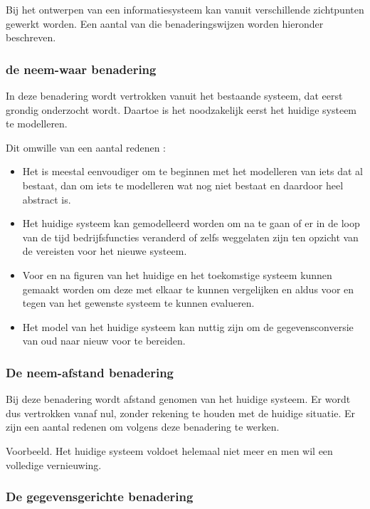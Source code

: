 Bij het ontwerpen van een informatiesysteem kan vanuit verschillende zichtpunten gewerkt worden. Een aantal van die benaderingswijzen worden hieronder beschreven.

\subsubsection{de neem-waar benadering}

In deze benadering wordt vertrokken vanuit het bestaande systeem, dat eerst grondig onderzocht wordt. Daartoe is het noodzakelijk eerst het huidige systeem te modelleren.

Dit omwille van een aantal redenen :

\begin{itemize}
    \item Het is meestal eenvoudiger om te beginnen met het modelleren van iets dat al bestaat, dan om iets te modelleren wat nog niet bestaat en daardoor heel abstract is.
    \item Het huidige systeem kan gemodelleerd worden om na te gaan of er in de loop van de tijd bedrijfsfuncties veranderd of zelfs weggelaten zijn ten opzicht van de vereisten voor het nieuwe systeem.
    \item Voor en na figuren van het huidige en het toekomstige systeem kunnen gemaakt worden om deze met elkaar te kunnen vergelijken en aldus voor en tegen van het gewenste systeem te kunnen evalueren.
    \item Het model van het huidige systeem kan nuttig zijn om de gegevensconversie van oud naar nieuw voor te bereiden.
\end{itemize}

\subsubsection{De neem-afstand benadering}

Bij deze benadering wordt afstand genomen van het huidige systeem. Er wordt dus vertrokken vanaf nul, zonder rekening te houden met de huidige situatie. Er zijn een aantal redenen om volgens deze benadering te werken.

Voorbeeld. Het huidige systeem voldoet helemaal niet meer en men wil een volledige vernieuwing.

\subsubsection{De gegevensgerichte benadering}


